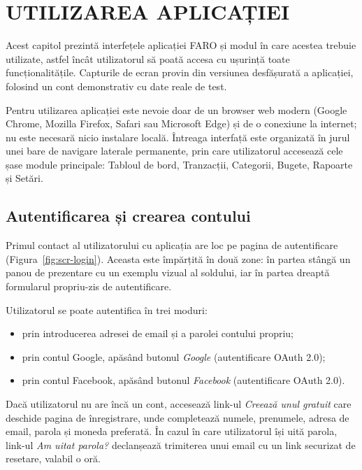 \documentclass[12pt,a4paper,oneside]{report}
\begin{document}
\chapter{UTILIZAREA APLICAȚIEI}
\label{cap:utilizare}

Acest capitol prezintă interfețele aplicației FARO și modul în care acestea trebuie utilizate, astfel încât utilizatorul să poată accesa cu ușurință toate funcționalitățile. Capturile de ecran provin din versiunea desfășurată a aplicației, folosind un cont demonstrativ cu date reale de test.

Pentru utilizarea aplicației este nevoie doar de un browser web modern (Google Chrome, Mozilla Firefox, Safari sau Microsoft Edge) și de o conexiune la internet; nu este necesară nicio instalare locală. Întreaga interfață este organizată în jurul unei bare de navigare laterale permanente, prin care utilizatorul accesează cele șase module principale: Tabloul de bord, Tranzacții, Categorii, Bugete, Rapoarte și Setări.

\section{Autentificarea și crearea contului}

Primul contact al utilizatorului cu aplicația are loc pe pagina de autentificare (Figura~\ref{fig:scr-login}). Aceasta este împărțită în două zone: în partea stângă un panou de prezentare cu un exemplu vizual al soldului, iar în partea dreaptă formularul propriu-zis de autentificare.

Utilizatorul se poate autentifica în trei moduri:
\begin{itemize}[leftmargin=2cm,itemsep=2pt]
  \item prin introducerea adresei de email și a parolei contului propriu;
  \item prin contul Google, apăsând butonul \emph{Google} (autentificare OAuth 2.0);
  \item prin contul Facebook, apăsând butonul \emph{Facebook} (autentificare OAuth 2.0).
\end{itemize}

Dacă utilizatorul nu are încă un cont, accesează link-ul \emph{Creează unul gratuit} care deschide pagina de înregistrare, unde completează numele, prenumele, adresa de email, parola și moneda preferată. În cazul în care utilizatorul își uită parola, link-ul \emph{Am uitat parola?} declanșează trimiterea unui email cu un link securizat de resetare, valabil o oră.
\end{document}
